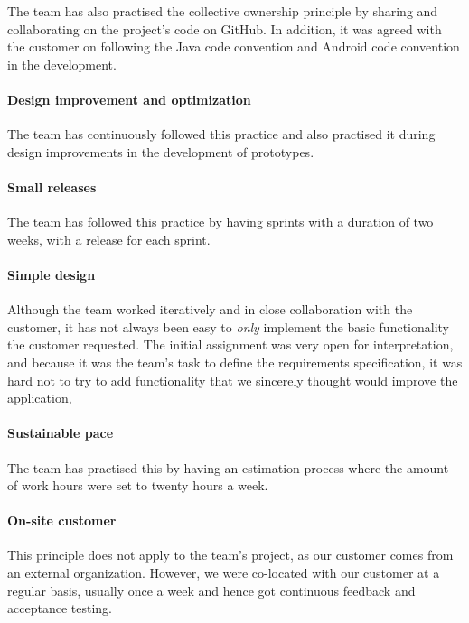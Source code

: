 The team has also practised the collective ownership principle by sharing and collaborating on the project's code on GitHub. In addition, it was agreed with the customer on following the Java code convention and Android code convention in the development.

\paragraph{Design improvement and optimization}
The team has continuously followed this practice and also practised it during design improvements in the development of prototypes.
 
\paragraph{Small releases}
The team has followed this practice by having sprints with a duration of two weeks, with a release for each sprint.


\paragraph{Simple design}
Although the team worked iteratively and in close collaboration with the customer, it has not always been easy to \emph{only} implement the basic functionality the customer requested. The initial assignment was very open for interpretation, and because it was the team's task to define the requirements specification, it was hard not to try to add functionality that we sincerely thought would improve the application, 

\paragraph{Sustainable pace}
The team has practised this by having an estimation process where the amount of work hours were set to twenty hours a week.

\paragraph{On-site customer}
This principle does not apply to the team's project, as our customer comes from an external organization. However, we were co-located with our customer at a regular basis, usually once a week and hence got continuous feedback and acceptance testing.

